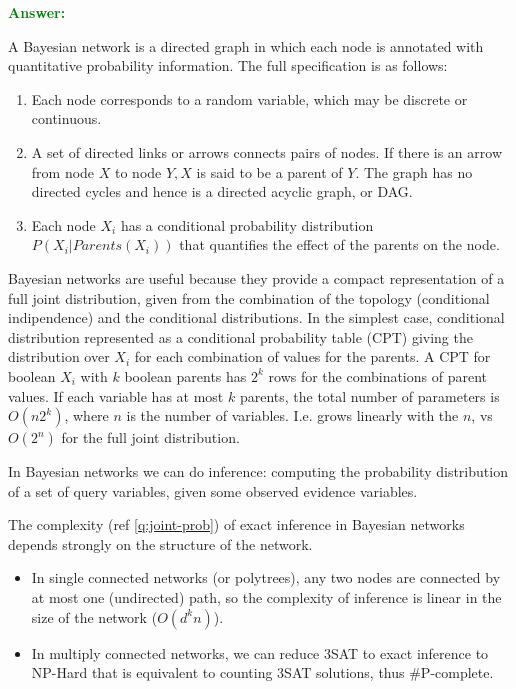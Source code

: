 \documentclass[12pt]{article}
\begin{document}
\begin{enumerate}[label=\textbf{U.\arabic*}]
    \textcolor{green}{\textbf{Answer:}}

    A Bayesian network is a directed graph in which each node is annotated with quantitative probability information. 
    The full specification is as follows:
    \begin{enumerate}
        \item Each node corresponds to a random variable, which may be discrete or continuous.
        \item A set of directed links or arrows connects pairs of nodes. 
        If there is an arrow from node $X$ to node $Y,X$ is said to be a parent of $Y$.
        The graph has no directed cycles and hence is a directed acyclic graph, or DAG.
        \item Each node $X_i$ has a conditional probability distribution \\$P(X_i|Parents(X_i))$ 
        that quantifies the effect of the parents on the node.
    \end{enumerate}

    Bayesian networks are useful because they provide a compact representation of a full joint distribution, 
    given from the combination of the topology (conditional indipendence) and the conditional distributions.
    In the simplest case, conditional distribution represented as a conditional probability table (CPT) giving the distribution over $X_i$ for each combination of values for the parents.
    A CPT for boolean $X_i$ with $k$ boolean parents has $2^k$ rows for the combinations of parent values.
    If each variable has at most $k$ parents, the total number of parameters is $O(n2^k)$, where $n$ is the number of variables.
    I.e. grows linearly with the $n$, vs $O(2^n)$ for the full joint distribution.

    In Bayesian networks we can do inference: computing the probability distribution of a set of query variables, given some observed evidence variables.
    
    The complexity (ref \ref{q:joint-prob}) of exact inference in Bayesian networks depends strongly on the structure of the network.
    \begin{itemize}
        \item In single connected networks (or polytrees), any two nodes are connected by at most one (undirected) path, 
        so the complexity of inference is linear in the size of the network ($O(d^kn)$).
        \item In multiply connected networks, we can reduce 3SAT to exact inference to NP-Hard that is equivalent to
        counting 3SAT solutions, thus \#P-complete.
    \end{itemize}
    

\end{enumerate}
\end{document}
